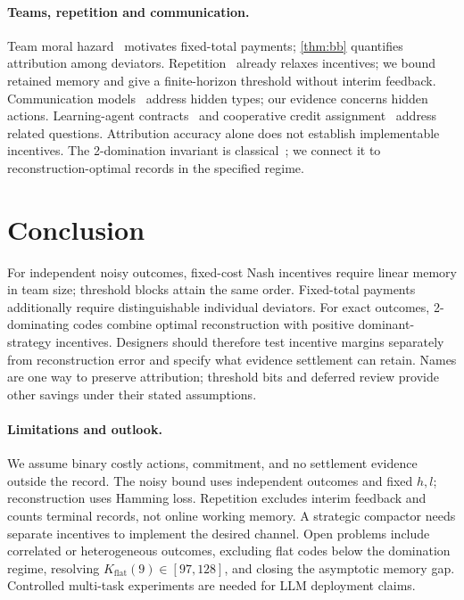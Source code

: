 \documentclass[sigconf,anonymous,acmthm=false]{aamas}
\theoremstyle{acmplain}
\theoremstyle{acmdefinition}
\newcommand{\Kflat}{K_{\mathrm{flat}}}
\begin{document}
\paragraph{Teams, repetition and communication.}
Team moral hazard~\cite{holmstrom1982teams,legrosmatthews1993,rahmanobara2010} motivates
fixed-total payments; \cref{thm:bb} quantifies attribution among deviators.
Repetition~\cite{radner1985repeated,jacksonsonnenschein2007} already relaxes incentives;
we bound retained memory and give a finite-horizon threshold without interim feedback.
Communication models~\cite{fadelsegal2009,blumrosen2007auctions} address hidden types;
our evidence concerns hidden actions. Learning-agent contracts~\cite{haupt2023contracts,ivanov2024principal,shao2025truth}
and cooperative credit assignment~\cite{foerster2018coma,sunehag2018vdn,rashid2018qmix,li2025nucleolus}
address related questions. Attribution accuracy alone does not establish implementable incentives.
The 2-domination invariant is classical~\cite{fink1985ndomination,chellali2012survey,bujtas2016bounds,ostergard2001length9};
we connect it to reconstruction-optimal records in the specified regime.

\section{Conclusion}\label{sec:conclusion}

For independent noisy outcomes, fixed-cost Nash incentives require linear memory in
team size; threshold blocks attain the same order. Fixed-total payments additionally
require distinguishable individual deviators. For exact outcomes, 2-dominating codes
combine optimal reconstruction with positive dominant-strategy incentives. Designers
should therefore test incentive margins separately from reconstruction error and specify
what evidence settlement can retain. Names are one way to preserve attribution;
threshold bits and deferred review provide other savings under their stated assumptions.

\paragraph{Limitations and outlook.}
We assume binary costly actions, commitment, and no settlement evidence outside the record.
The noisy bound uses independent outcomes and fixed $h,l$; reconstruction uses Hamming loss.
Repetition excludes interim feedback and counts terminal records, not online working memory.
A strategic compactor needs separate incentives to implement the desired channel.
Open problems include correlated or heterogeneous outcomes, excluding flat codes below the
domination regime, resolving $\Kflat(9)\in[97,128]$, and closing the asymptotic memory gap.
Controlled multi-task experiments are needed for LLM deployment claims.

\label{endbody}\clearpage
\balance


\end{document}
